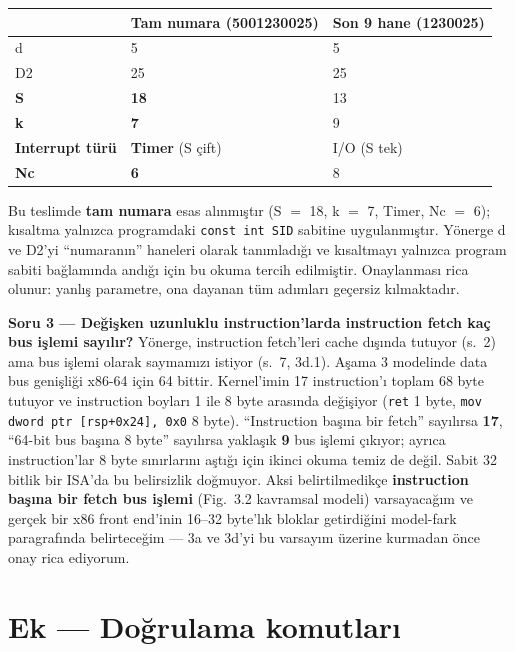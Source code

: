 \documentclass[11pt,a4paper]{article}
\newcommand{\tl}{\texttt}
\begin{document}
\begin{longtable}{p{4.6cm}p{4.6cm}p{4.6cm}}
\toprule
 & \textbf{Tam numara (5001230025)} & \textbf{Son 9 hane (1230025)}\\
\midrule
d & 5 & 5\\
D2 & 25 & 25\\
\textbf{S} & \textbf{18} & 13\\
\textbf{k} & \textbf{7} & 9\\
\textbf{Interrupt türü} & \textbf{Timer} (S çift) & I/O (S tek)\\
\textbf{Nc} & \textbf{6} & 8\\
\bottomrule
\end{longtable}

Bu teslimde \textbf{tam numara} esas alınmıştır (S $=$ 18, k $=$ 7, Timer, Nc $=$ 6); kısaltma
yalnızca programdaki \tl{const int SID} sabitine uygulanmıştır. Yönerge d ve D2'yi ``numaranın''
haneleri olarak tanımladığı ve kısaltmayı yalnızca program sabiti bağlamında andığı için bu okuma
tercih edilmiştir. Onaylanması rica olunur: yanlış parametre, ona dayanan tüm adımları geçersiz
kılmaktadır.

\textbf{Soru 3 --- Değişken uzunluklu instruction'larda instruction fetch kaç bus işlemi sayılır?}
Yönerge, instruction fetch'leri cache dışında tutuyor (s.~2) ama bus işlemi olarak saymamızı
istiyor (s.~7, 3d.1). Aşama 3 modelinde data bus genişliği x86-64 için 64 bittir. Kernel'imin
17 instruction'ı toplam 68 byte tutuyor ve instruction boyları 1 ile 8 byte arasında değişiyor
(\tl{ret} 1 byte, \tl{mov dword ptr [rsp+0x24], 0x0} 8 byte). ``Instruction başına bir fetch''
sayılırsa \textbf{17}, ``64-bit bus başına 8 byte'' sayılırsa yaklaşık \textbf{9} bus işlemi
çıkıyor; ayrıca instruction'lar 8 byte sınırlarını aştığı için ikinci okuma temiz de değil.
Sabit 32 bitlik bir ISA'da bu belirsizlik doğmuyor. Aksi belirtilmedikçe \textbf{instruction
başına bir fetch bus işlemi} (Fig.~3.2 kavramsal modeli) varsayacağım ve gerçek bir x86 front
end'inin 16--32 byte'lık bloklar getirdiğini model-fark paragrafında belirteceğim --- 3a ve 3d'yi
bu varsayım üzerine kurmadan önce onay rica ediyorum.

\section*{Ek --- Doğrulama komutları}
\end{document}
